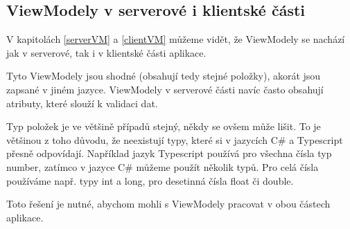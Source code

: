 \subsection{ViewModely v serverové i klientské části}

V kapitolách \ref{serverVM} a \ref{clientVM} můžeme vidět, že ViewModely se nachází jak v serverové, tak i v klientské části aplikace. 

Tyto ViewModely jsou shodné (obsahují tedy stejné položky), akorát jsou zapsané v jiném jazyce. ViewModely v serverové části navíc často obsahují atributy, které slouží k validaci dat.

Typ položek je ve většině případů stejný, někdy se ovšem může lišit. To je většinou z toho důvodu, že neexistují typy, které si v jazycích C\# a Typescript přesně odpovídají.
Například jazyk Typescript používá pro všechna čísla typ number, zatímco v jazyce C\# můžeme použít několik typů. 
Pro celá čísla používáme např. typy int a long, pro desetinná čísla float či double.

Toto řešení je nutné, abychom mohli s ViewModely pracovat v obou částech aplikace.